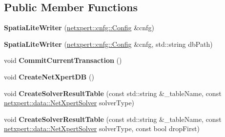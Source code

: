 \subsection*{Public Member Functions}
\begin{DoxyCompactItemize}
\item 
{\bfseries Spatia\+Lite\+Writer} (\hyperlink{structnetxpert_1_1cnfg_1_1Config}{netxpert\+::cnfg\+::\+Config} \&cnfg)\hypertarget{classnetxpert_1_1io_1_1SpatiaLiteWriter_a48bbbeae8faa48aa23691c0651ffd6e1}{}\label{classnetxpert_1_1io_1_1SpatiaLiteWriter_a48bbbeae8faa48aa23691c0651ffd6e1}

\item 
{\bfseries Spatia\+Lite\+Writer} (\hyperlink{structnetxpert_1_1cnfg_1_1Config}{netxpert\+::cnfg\+::\+Config} \&cnfg, std\+::string db\+Path)\hypertarget{classnetxpert_1_1io_1_1SpatiaLiteWriter_af56b5642da873797a7f0455e9c8e7d0a}{}\label{classnetxpert_1_1io_1_1SpatiaLiteWriter_af56b5642da873797a7f0455e9c8e7d0a}

\item 
void {\bfseries Commit\+Current\+Transaction} ()\hypertarget{classnetxpert_1_1io_1_1SpatiaLiteWriter_a760b619e9bf1f1686c7a477fc727c2c2}{}\label{classnetxpert_1_1io_1_1SpatiaLiteWriter_a760b619e9bf1f1686c7a477fc727c2c2}

\item 
void {\bfseries Create\+Net\+Xpert\+DB} ()\hypertarget{classnetxpert_1_1io_1_1SpatiaLiteWriter_aa5aed60ecc92a8aa169cc5f49e73840d}{}\label{classnetxpert_1_1io_1_1SpatiaLiteWriter_aa5aed60ecc92a8aa169cc5f49e73840d}

\item 
void {\bfseries Create\+Solver\+Result\+Table} (const std\+::string \&\+\_\+table\+Name, const \hyperlink{namespacenetxpert_1_1data_a923ee7cb7eab8b9dbfd62fb6d26f51cb}{netxpert\+::data\+::\+Net\+Xpert\+Solver} solver\+Type)\hypertarget{classnetxpert_1_1io_1_1SpatiaLiteWriter_ac98e76bdc1dc0796f20f5a82b548aa93}{}\label{classnetxpert_1_1io_1_1SpatiaLiteWriter_ac98e76bdc1dc0796f20f5a82b548aa93}

\item 
void {\bfseries Create\+Solver\+Result\+Table} (const std\+::string \&\+\_\+table\+Name, const \hyperlink{namespacenetxpert_1_1data_a923ee7cb7eab8b9dbfd62fb6d26f51cb}{netxpert\+::data\+::\+Net\+Xpert\+Solver} solver\+Type, const bool drop\+First)\hypertarget{classnetxpert_1_1io_1_1SpatiaLiteWriter_aac0ed9fe0552f78afab69e8f4cb600c0}{}\label{classnetxpert_1_1io_1_1SpatiaLiteWriter_aac0ed9fe0552f78afab69e8f4cb600c0}


\end{DoxyCompactItemize}
